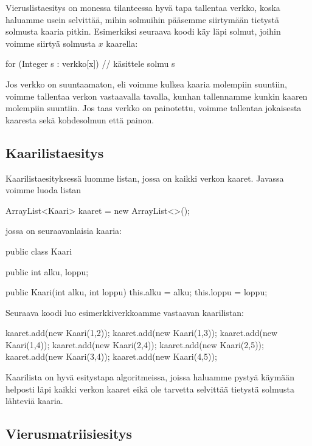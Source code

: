 Vieruslistaesitys on monessa tilanteessa hyvä tapa tallentaa verkko,
koska haluamme usein selvittää,
mihin solmuihin pääsemme siirtymään tietystä solmusta kaaria pitkin.
Esimerkiksi seuraava koodi käy läpi solmut,
joihin voimme siirtyä solmusta $x$ kaarella:

\begin{code}
for (Integer s : verkko[x]) {
    // käsittele solmu s
}
\end{code}

Jos verkko on suuntaamaton, eli voimme kulkea kaaria molempiin suuntiin,
voimme tallentaa verkon vastaavalla tavalla,
kunhan tallennamme kunkin kaaren molempiin suuntiin.
Jos taas verkko on painotettu, voimme tallentaa jokaisesta
kaaresta sekä kohdesolmun että painon.

\subsection{Kaarilistaesitys}

Kaarilistaesityksessä luomme listan,
jossa on kaikki verkon kaaret.
Javassa voimme luoda listan

\begin{code}
ArrayList<Kaari> kaaret = new ArrayList<>();
\end{code}

jossa on seuraavanlaisia kaaria:

\begin{code}
public class Kaari {
    public int alku, loppu;

    public Kaari(int alku, int loppu) {
        this.alku = alku;
        this.loppu = loppu;
    }
}
\end{code}

Seuraava koodi luo esimerkkiverkkoamme vastaavan kaarilistan:

\begin{code}
kaaret.add(new Kaari(1,2));
kaaret.add(new Kaari(1,3));
kaaret.add(new Kaari(1,4));
kaaret.add(new Kaari(2,4));
kaaret.add(new Kaari(2,5));
kaaret.add(new Kaari(3,4));
kaaret.add(new Kaari(4,5));
\end{code}

Kaarilista on hyvä esitystapa algoritmeissa,
joissa haluamme pystyä käy\-mään helposti läpi
kaikki verkon kaaret eikä ole tarvetta
selvittää tietystä solmusta lähteviä kaaria.

\subsection{Vierusmatriisiesitys}

